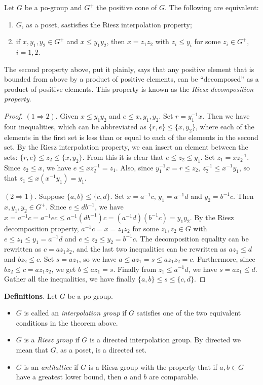 \documentclass[12pt]{article}
\begin{document}
Let $G$ be a po-group and $G^+$ the positive cone of $G$.  The following are equivalent:
\begin{enumerate}
\item $G$, as a poset, sastisfies the Riesz interpolation property;
\item if $x,y_1,y_2\in G^+$ and $x\le y_1y_2$, then $x=z_1z_2$ with $z_i\le y_i$ for some $z_i\in G^+$, $i=1,2$.
\end{enumerate}
The second property above, put it plainly, says that any positive element that is bounded from above by a product of positive elements, can be ``decomposed'' as a product of positive elements.  This property is known as the \emph{Riesz decomposition property}.
\begin{proof}
$(1\Rightarrow 2)$.  Given $x\le y_1y_2$ and $e\le x,y_1,y_2$.  Set $r=y_1^{-1}x$.  Then we have four inequalities, which can be abbreviated as $\lbrace r,e\rbrace \le \lbrace x,y_2\rbrace$, where each of the elements in the first set is less than or equal to each of the elements in the second set.  By the Riesz interpolation property, we can insert an element between the sets: $\lbrace r,e\rbrace \le z_2 \le \lbrace x,y_2\rbrace$.  From this it is clear that $e\le z_2\le y_1$.  Set $z_1=xz_2^{-1}$.  Since $z_2\le x$, we have $e\le xz_2^{-1}=z_1$.  Also, since $y_1^{-1}x=r\le z_2$, $z_2^{-1}\le x^{-1}y_1$, so that $z_1\le x(x^{-1}y_1)=y_1$.

$(2\Rightarrow 1)$.  Suppose $\lbrace a,b\rbrace \le \lbrace c,d\rbrace$.  Set $x=a^{-1}c$, $y_1=a^{-1}d$ and $y_2=b^{-1}c$.  Then $x,y_1,y_2\in G^+$.  Since $e\le db^{-1}$, we have $x=a^{-1}c= a^{-1}ec\le a^{-1}(db^{-1})c= (a^{-1}d)(b^{-1}c)=y_1y_2$.  By the Riesz decomposition property, $a^{-1}c=x=z_1z_2$ for some $z_1,z_2\in G$ with $e\le z_1\le y_1=a^{-1}d$ and $e\le z_2\le y_2=b^{-1}c$.  The decomposition equality can be rewritten as $c=az_1z_2$, and the last two inequalities can be rewritten as $az_1\le d$ and $bz_2\le c$.  Set $s=az_1$, so we have $a\le az_1=s\le az_1z_2=c$.  Furthermore, since $bz_2\le c=az_1z_2$, we get $b\le az_1=s$.  Finally from $z_1\le a^{-1}d$, we have $s=az_1\le d$.  Gather all the inequalities, we have finally $\lbrace a,b\rbrace\le s\le\lbrace c,d\rbrace$.
\end{proof}

\textbf{Definitions}.  Let $G$ be a po-group.
\begin{itemize}
\item $G$ is called an \emph{interpolation group} if $G$ satisfies one of the two equivalent conditions in the theorem above.
\item $G$ is a \emph{Riesz group} if $G$ is a directed interpolation group.  By directed we mean that $G$, as a poset, is a directed set.
\item $G$ is an \emph{antilattice} if $G$ is a Riesz group with the property that if $a,b\in G$ have a greatest lower bound, then $a$ and $b$ are comparable.
\end{itemize}
\end{document}
